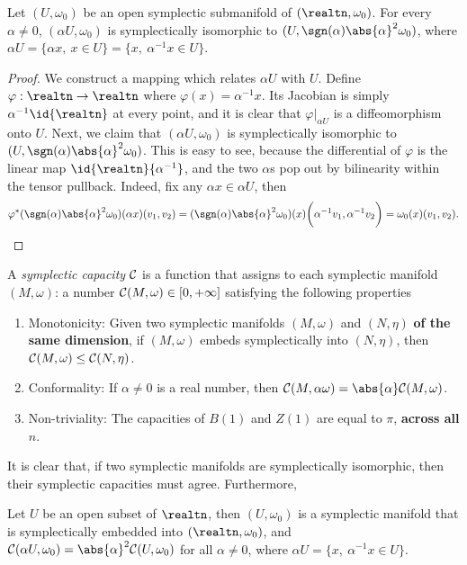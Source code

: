 \documentclass[../main-v2-manifolds.tex]{subfiles}
\begin{document}
\begin{lemma}
    Let $(U,\omega_0)$ be an open symplectic submanifold of $(\realtn,\omega_0)$. For every $\alpha\neq 0$, $(\alpha U,\omega_0)$ is symplectically isomorphic to $(U,\sgn(\alpha)\abs{\alpha}^2\omega_0)$, where $\alpha U=\{\alpha x,\: x\in U\}=\{x,\: \alpha^{-1}x\in U\}$.
\end{lemma}
\begin{proof}
    We construct a mapping which relates $\alpha U$ with $U$. Define $\varphi:\realtn\to\realtn$ where $\varphi(x) = \alpha^{-1}x$. Its Jacobian is simply $\alpha^{-1}\id{\realtn}$ at every point, and it is clear that $\varphi\vert_{\alpha U}$ is a diffeomorphism onto $U$. Next, we claim that $(\alpha U,\omega_0)$ is symplectically isomorphic to $(U,\sgn(\alpha)\abs{\alpha}^2\omega_0)$. This is easy to see, because the differential of $\varphi$ is the linear map $\id{\realtn}{\alpha^{-1}}$, and the two $\alpha$s pop out by bilinearity within the tensor pullback. Indeed, fix any $\alpha x\in \alpha U$, then 
    \[
        \varphi^*(\sgn(\alpha)\abs{\alpha}^2\omega_0)(\alpha x)(v_1,v_2) = (\sgn(\alpha)\abs{\alpha}^2\omega_0)(x)\biggl(\alpha^{-1}v_1, \alpha^{-1}v_2\biggr) = \omega_0(x)(v_1,v_2).
    \]
\end{proof}
\begin{definition}
    A \emph{symplectic capacity} $\mathcal{C}$ is a function that assigns to each symplectic manifold $(M,\omega)$:  a number $\mathcal{C}(M,\omega)\in[0,+\infty]$ satisfying the following properties
    \begin{enumerate}
        \item Monotonicity: Given two symplectic manifolds $(M,\omega)$ and $(N,\eta)$ \textbf{of the same dimension}, if $(M,\omega)$ embeds symplectically into $(N,\eta)$, then $\mathcal{C}(M,\omega) \leq \mathcal{C}(N,\eta)$.
        \item Conformality: If $\alpha\neq 0$ is a real number, then $\frakc(M,\alpha\omega) = \abs{\alpha}\frakc(M,\omega)$.
        \item Non-triviality: The capacities of $B(1)$ and $Z(1)$ are equal to $\pi$, \textbf{across all $n$}.
    \end{enumerate}
\end{definition}
It is clear that, if two symplectic manifolds are symplectically isomorphic, then their symplectic capacities must agree. Furthermore,
\begin{wts}\label{thm:symplectic capacity scaling open subsets}
    Let $U$ be an open subset of $\realtn$, then $(U,\omega_0)$ is a symplectic manifold that is symplectically embedded into $(\realtn,\omega_0)$, and $\frakc(\alpha U,\omega_0) = \abs{\alpha}^2\frakc(U,\omega_0)$ for all $\alpha\neq 0$, where $\alpha U = \{x,\: \alpha^{-1} x\in U\}$.
\end{wts}
\end{document}

